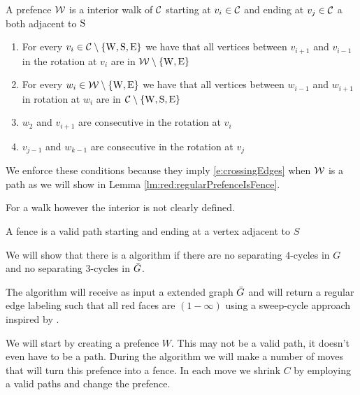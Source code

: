   \begin{defi}[Prefence]
  A prefence $\mathcal{W}$ is a interior walk of $\mathcal{C}$ starting at $v_i \in \mathcal{C}$ and ending at $v_j \in \mathcal{C}$ a both adjacent to $\mathrm{S}$
  \begin{enumerate}
   \renewcommand*{\labelenumi}{(P\arabic{enumi})}%
   \renewcommand*{\theenumi}{(P\arabic{enumi})}%
    \item  For every $v_i \in \mathcal{C} \setminus \left\lbrace {\mathrm{W}, \mathrm{S}, \mathrm{E}} \right\rbrace$ we have that all vertices between $v_{i+1}$ and $v_{i-1}$ in the rotation at $v_i$ are in $\mathcal{W} \setminus \left\lbrace {\mathrm{W}, \mathrm{E}} \right\rbrace$
    \label{p:C}
    \item For every $w_i \in \mathcal{W} \setminus \left\lbrace {\mathrm{W}, \mathrm{E}} \right\rbrace$ we have that all vertices between $w_{i-1}$ and $w_{i+1}$ in rotation at $w_i$ are in $\mathcal{C} \setminus \left\lbrace {\mathrm{W}, \mathrm{S}, \mathrm{E}} \right\rbrace$
    \label{p:W}
    \item $w_2$ and $v_{i+1}$ are consecutive in the rotation at $v_i$
    \label{p:pW}
    \item $v_{j-1}$ and $w_{k-1}$ are consecutive in the rotation at $v_j$
    \label{p:pE}
  \end{enumerate}
  \end{defi}


  We enforce these conditions because they imply \ref{e:crossingEdges} when $\mathcal{W}$ is a path as we will show in Lemma \ref{lm:red:regularPrefenceIsFence}.

  For a walk however the interior is not clearly defined.

  \begin{defi}[Fence]
    A fence is a valid path starting and ending at a vertex adjacent to $S$
  \end{defi}



  We will show that there is a algorithm if there are no separating $4$-cycles in $G$ and no separating $3$-cycles in $\bar{G}$.


  The algorithm will receive as input a extended graph $\bar{G}$ and will return a regular edge labeling such that all red faces are $(1-\infty)$ using a sweep-cycle approach inspired by \Fusy \cite{Fusy2006}.

  We will start by creating a prefence $W$. This may not be a valid path, it doesn't even have to be a path. During the algorithm we will make a number of moves that will turn this prefence into a fence. In each move we shrink $C$ by employing a valid paths and change the prefence.

